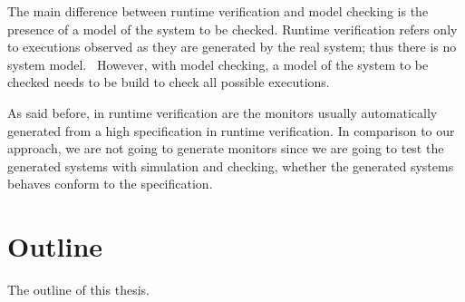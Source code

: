 The main difference between runtime verification and model checking is the
presence of a model of the system to be checked.
Runtime verification refers only to executions observed as they are generated by
the real system; thus there is no system model.~\cite[p.~295]{leucker2009brief}
However, with model checking, a model of the system to be checked needs to be
build to check all possible executions.

As said before, in runtime verification are the monitors usually automatically
generated from a high specification in runtime verification. In comparison to
our approach, we are not going to generate monitors since we are going to test
the generated systems with simulation and checking,
whether the generated systems behaves conform to the specification.


\section{Outline}
The outline of this thesis.
